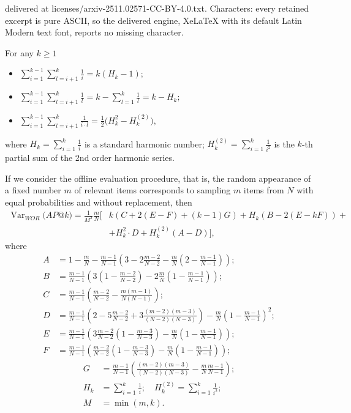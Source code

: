 \documentclass[10pt,a4paper]{amsart}
\begin{document}
delivered at licenses/arxiv-2511.02571-CC-BY-4.0.txt. Characters: every retained excerpt is pure ASCII, so the delivered engine, XeLaTeX with its default Latin Modern text font, reports no missing character.
\begin{lemma}\label{lem1}
For any $k\geq 1$
\begin{itemize}
\item[(i)]  $\sum_{i=1}^{k-1}\sum_{l=i+1}^{k}\frac{1}{i}  =  k(H_k-1);$
\item[(ii)] $\sum_{i=1}^{k-1} \sum_{l=i+1}^{k} \frac{1}{l}  = k-\sum_{l=1}^{k}\frac{1}{l}=k-H_k;$
\item[(iii)] $\sum_{i=1}^{k-1} \sum_{l=i+1}^{k} \frac{1}{i\cdot l}  =  \frac{1}{2}\bigg(H_k^2-H_k^{\left(2\right)}\bigg),$   
\end{itemize}
where  $H_k=\sum_{i=1}^{k} \frac{1}{i}$ is a standard harmonic number; 
      $H_k^{\left(2\right)}=\sum_{i=1}^{k} \frac{1}{i^2}$ is the $k$-th partial sum of the 2nd order harmonic series.
\end{lemma}

\begin{theorem} \label{th2wor} If we consider the offline evaluation procedure, that is, the random appearance of a fixed number $m$ of relevant items corresponds to sampling $m$ items from $N$ with equal probabilities and without replacement, then 
\begin{equation*}
\begin{split} \operatorname{Var}_{WOR}\big(AP@k\big)=\frac{1}{M^2} \frac{m}{N}\Bigg[& k(C+2(E-F) + (k-1)G) + H_k(B-2(E-kF))+\\ 
& + H_k^2 \cdot D + H_k^{\left(2\right)}(A-D) \Bigg],
\end{split}
\end{equation*}
where 
\begin{align*}
 A & =  1- \frac{m}{N}-\frac{m-1}{N-1} \left(3-2\frac{m-2}{N-2}-\frac{m}{N}\left(2-\frac{m-1}{N-1}\right)\right); \\
 B & =  \frac{m-1}{N-1}\left(3\left(1-\frac{m-2}{N-2}\right)-2\frac{m}{N}\left(1-\frac{m-1}{N-1}\right)\right);\\
C & = \frac{m-1}{N-1}\left(\frac{m-2}{N-2}-\frac{m(m-1)}{N(N-1)}\right);\\
D & = \frac{m-1}{N-1}\left(2-5\frac{m-2}{N-2}+3\frac{(m-2)(m-3)}{(N-2)(N-3)}\right)-\frac{m}{N}\left(1-\frac{m-1}{N-1}\right)^2;\\
E& = \frac{m-1}{N-1}\left(3\frac{m-2}{N-2}\left(1-\frac{m-3}{N-3}\right)-\frac{m}{N}\left(1-\frac{m-1}{N-1}\right)\right);\\
F &= \frac{m-1}{N-1}\left(\frac{m-2}{N-2}\left(1-\frac{m-3}{N-3}\right)-\frac{m}{N}\left(1-\frac{m-1}{N-1}\right)\right); 
\end{align*}
 \begin{align*}
G & = \frac{m-1}{N-1}\left(\frac{(m-2)(m-3)}{(N-2)(N-3)}-\frac{m}{N}\frac{m-1}{N-1}\right);\\
H_{k} & = \sum_{i=1}^k \frac{1}{i}; \quad H^{(2)}_{k} = \sum_{i=1}^k \frac{1}{i^2};\\
M & = \min(m,k). 
\end{align*}
\end{theorem}
\end{document}
